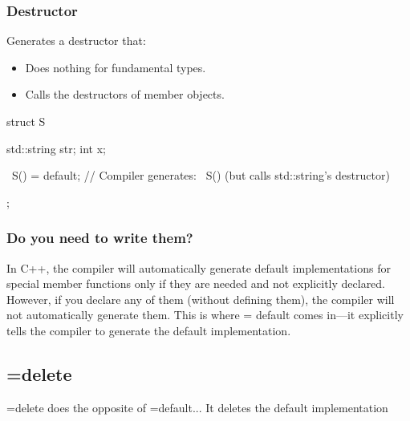 \documentclass{report}
\begin{document}
    \subsubsection{Destructor}
    \bigbreak \noindent 
    Generates a destructor that:
    \begin{itemize}
        \item Does nothing for fundamental types.
        \item Calls the destructors of member objects.
    \end{itemize}
    \bigbreak \noindent 
    \begin{cppcode}
        struct S {
            std::string str;
            int x;

            ~S() = default;  // Compiler generates: ~S() {} (but calls std::string's destructor)
        };
    \end{cppcode}

    \bigbreak \noindent 
    \subsubsection{Do you need to write them?}
    \bigbreak \noindent 
    In C++, the compiler will automatically generate default implementations for special member functions only if they are needed and not explicitly declared.
    \bigbreak \noindent 
    However, if you declare any of them (without defining them), the compiler will not automatically generate them. This is where = default comes in—it explicitly tells the compiler to generate the default implementation.


    \bigbreak \noindent 
    \subsection{=delete}
    \bigbreak \noindent 
    =delete does the opposite of =default... It deletes the default implementation

    \bigbreak \noindent 
\end{document}
